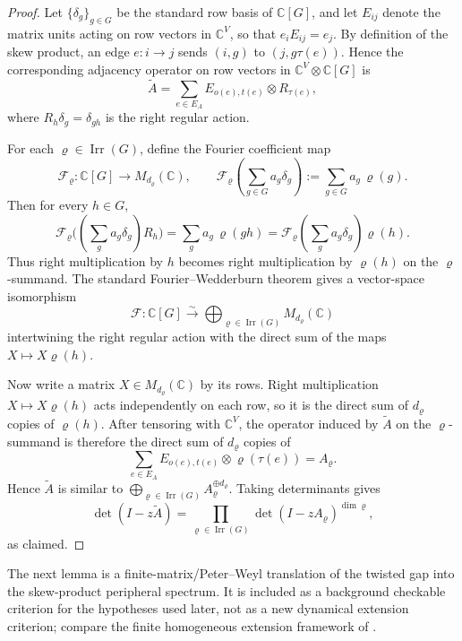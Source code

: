 \documentclass[11pt,a4paper]{amsart}
\theoremstyle{plain}
\theoremstyle{definition}
\theoremstyle{remark}
\DeclareMathOperator{\Irr}{Irr}
\newcommand{\CC}{\mathbb{C}}
\begin{document}
\begin{proof}
  Let \(\{\delta_g\}_{g\in G}\) be the standard row basis of \(\CC[G]\),
  and let \(E_{ij}\) denote the matrix units acting on row vectors in
  \(\CC^V\), so that \(e_iE_{ij}=e_j\). By definition of the skew
  product, an edge \(e:i\to j\) sends \((i,g)\) to \((j,g\tau(e))\).
  Hence the corresponding adjacency operator on row vectors in
  \(\CC^V\otimes\CC[G]\) is
  \[
    \widetilde A
    =
    \sum_{e\in E_A} E_{o(e),t(e)}\otimes R_{\tau(e)},
  \]
  where \(R_h\delta_g=\delta_{gh}\) is the right regular action.

  For each \(\varrho\in\Irr(G)\), define the Fourier coefficient map
  \[
    \mathcal F_\varrho:\CC[G]\to M_{d_\varrho}(\CC),
    \qquad
    \mathcal F_\varrho\!\left(\sum_{g\in G}a_g\delta_g\right)
    :=\sum_{g\in G}a_g\,\varrho(g).
  \]
  Then for every \(h\in G\),
  \[
    \mathcal F_\varrho\bigl((\sum_g a_g\delta_g)R_h\bigr)
    =\sum_g a_g\,\varrho(gh)
    =\mathcal F_\varrho\!\left(\sum_g a_g\delta_g\right)\varrho(h).
  \]
  Thus right multiplication by \(h\) becomes right multiplication by
  \(\varrho(h)\) on the \(\varrho\)-summand. The standard
  Fourier--Wedderburn theorem gives a vector-space isomorphism
  \[
    \mathcal F:\CC[G]\xrightarrow{\sim}
    \bigoplus_{\varrho\in\Irr(G)}M_{d_\varrho}(\CC)
  \]
  intertwining the right regular action with the direct sum of the maps
  \(X\mapsto X\varrho(h)\).

  Now write a matrix \(X\in M_{d_\varrho}(\CC)\) by its rows. Right
  multiplication \(X\mapsto X\varrho(h)\) acts independently on each row,
  so it is the direct sum of \(d_\varrho\) copies of \(\varrho(h)\). After
  tensoring with \(\CC^V\), the operator induced by \(\widetilde A\) on
  the \(\varrho\)-summand is therefore the direct sum of \(d_\varrho\)
  copies of
  \[
    \sum_{e\in E_A} E_{o(e),t(e)}\otimes \varrho(\tau(e))
    =
    A_\varrho.
  \]
  Hence \(\widetilde A\) is similar to
  \(\bigoplus_{\varrho\in\Irr(G)}A_\varrho^{\oplus d_\varrho}\). Taking
  determinants gives
  \[
    \det(I-z\widetilde A)
    =
    \prod_{\varrho\in\Irr(G)}
      \det(I-zA_\varrho)^{\dim\varrho},
  \]
  as claimed.
\end{proof}

The next lemma is a finite-matrix/Peter--Weyl translation of the twisted gap
into the skew-product peripheral spectrum.  It is included as a background
checkable criterion for the hypotheses used later, not as a new dynamical
extension criterion; compare the finite homogeneous extension framework of
\cite{Noorani1997HomogeneousExtensionsMarkov,NooraniParry1992ChebotarevShifts}.
\end{document}
